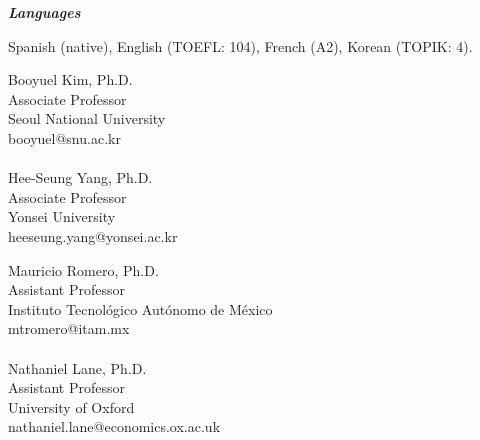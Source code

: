 \documentclass[11pt,article,oneside, a4paper]{memoir}
\begin{document}
\medskip
\noindent\emph{\textbf{Languages} \vspace{0.05in}}

\ind Spanish (native), English (TOEFL: 104), French (A2), Korean (TOPIK: 4).

\medskip

\noindent
\begin{minipage}[t]{.5\textwidth}
  \raggedright
  Booyuel Kim, Ph.D.        \\
  Associate Professor       \\
  Seoul National University \\
  booyuel@snu.ac.kr         \\
  ~~                        \\
  Hee-Seung Yang, Ph.D.     \\
  Associate Professor       \\
  Yonsei University         \\
  heeseung.yang@yonsei.ac.kr
\end{minipage}%
\begin{minipage}[t]{.7\textwidth}
\raggedright
  Mauricio Romero, Ph.D.    \\
  Assistant Professor       \\
  Instituto Tecnológico Autónomo de México \\
  mtromero@itam.mx          \\
  ~~                        \\
  Nathaniel Lane, Ph.D.     \\
  Assistant Professor       \\
  University of Oxford      \\
  nathaniel.lane@economics.ox.ac.uk
\end{minipage}
\end{document}
